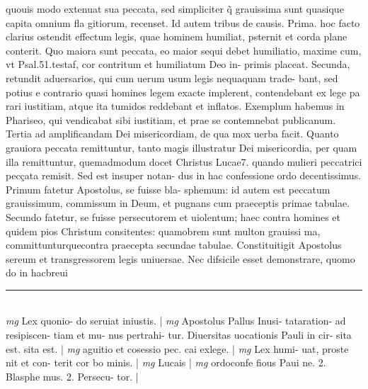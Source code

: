 \documentclass{article}
\begin{document}
\begin{pages}
quouis modo extenuat sua peccata, sed simpliciter q̃ grauissima sunt quasique  capita omnium fla gitiorum, recenset. Id autem tribus de causis. Prima. hoc facto clarius ostendit effectum legis, quae hominem humiliat, psternit et corda plane conterit. Quo maiora sunt peccata, eo maior sequi debet humiliatio, maxime cum, vt Psal.51.testaf, cor contritum et humiliatum Deo in- primis placeat. Secunda, retundit aduersarios, qui cum uerum usum legis nequaquam trade- bant, sed potius e contrario quasi homines legem exacte implerent, contendebant ex lege pa rari iustitiam, atque  ita tumidos reddebant et inflatos. Exemplum habemus in Phariseo, qui vendicabat sibi iustitiam, et prae se contemnebat publicanum. Tertia ad amplificandam Dei misericordiam, de qua mox uerba facit. Quanto grauiora peccata remittuntur, tanto magis illustratur Dei misericordia, per quam illa remittuntur, quemadmodum docet Christus Lucae7. quando mulieri peccatrici pecçata remisit. Sed est insuper notan- dus in hac confessione ordo decentissimus. Primum fatetur Apostolus, se fuisse bla- sphemum: id autem est peccatum grauissimum, commissum in Deum, et pugnans cum praeceptis primae tabulae. Secundo fatetur, se fuisse persecutorem et uiolentum; haec contra homines et quidem pios Christum consitentes: quamobrem sunt multon grauissi ma, committunturquecontra praecepta secundae tabulae. Constituitigit Apostolus sereum et transgressorem legis uniuersae. Nec difsicile esset demonstrare, quomo do in hacbreui  \pend
\vspace{0.5cm}\noindent
\vspace{0.2cm}\rule{1cm}{0.2pt}\\ 
\hspace{0.2cm}\textit{mg}
\footnotesize Lex quonio- do seruiat iniustis. 
\normalsize| 
\hspace{0.2cm}\textit{mg}
\footnotesize Apostolus Pallus Inusi- tataration- ad resipiscen- tiam et mu- nus pertrahi- tur. Diuersitas uocationis Pauli in cir- sita est. sita est. 
\normalsize| 
\hspace{0.2cm}\textit{mg}
\footnotesize aguitio et cosessio pec. cai exlege. 
\normalsize| 
\hspace{0.2cm}\textit{mg}
\footnotesize Lex humi- uat, proste nit et con- terit cor bo minis. 
\normalsize| 
\hspace{0.2cm}\textit{mg}
\footnotesize Lucais 
\normalsize| 
\hspace{0.2cm}\textit{mg}
\footnotesize ordoconfe fious Paui ne. 2. Blasphe mus. 2. Persecu- tor. 
\normalsize| 

\end{pages}
\end{document}
